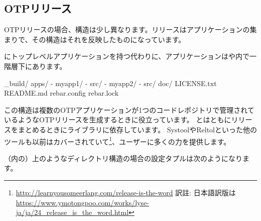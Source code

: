 \subsection{OTPリリース}
\label{subsec:building-otp-releases}

OTPリリースの場合、構造は少し異なります。リリースはアプリケーションの集まりで、その構造はそれを反映したものになっています。

にトップレベルアプリケーションを持つ代わりに、アプリケーションはや内で一階層下にあります。

\begin{VerbatimRaw}
_build/
apps/
  - myapp1/
     - src/
  - myapp2/
     - src/
doc/
LICENSE.txt
README.md
rebar.config
rebar.lock
\end{VerbatimRaw}

この構造は複数のOTPアプリケーションが1つのコードレポジトリで管理されているようなOTPリリースを生成するときに役立っています。
とはともにリリースをまとめるときにライブラリに依存しています。
SystoolやReltolといった他のツールも以前はカバーされていて\footnote{\href{http://learnyousomeerlang.com/release-is-the-word}{http://learnyousomeerlang.com/release-is-the-word} 訳註: 日本語訳版は \href{https://www.ymotongpoo.com/works/lyse-ja/ja/24\_release\_is\_the\_word.html}{https://www.ymotongpoo.com/works/lyse-ja/ja/24\_release\_is\_the\_word.html}}、ユーザーに多くの力を提供します。

（内の）上のようなディレクトリ構造の場合の設定タプルは次のようになります。

